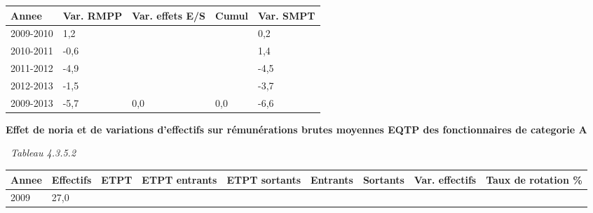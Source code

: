 \begin{longtable}[]{@{}lllll@{}}
\toprule
Annee & Var. RMPP & Var. effets E/S & Cumul & Var. SMPT\tabularnewline
\midrule
\endhead
2009-2010 & 1,2 & & & 0,2\tabularnewline
2010-2011 & -0,6 & & & 1,4\tabularnewline
2011-2012 & -4,9 & & & -4,5\tabularnewline
2012-2013 & -1,5 & & & -3,7\tabularnewline
2009-2013 & -5,7 & 0,0 & 0,0 & -6,6\tabularnewline
\bottomrule
\end{longtable}

\textbf{Effet de noria et de variations d'effectifs sur rémunérations
brutes moyennes EQTP des fonctionnaires de categorie A}

~\emph{Tableau 4.3.5.2}

\begin{longtable}[]{@{}lllllllll@{}}
\toprule
\begin{minipage}[b]{0.05\columnwidth}\raggedright
Annee\strut
\end{minipage} & \begin{minipage}[b]{0.08\columnwidth}\raggedright
Effectifs\strut
\end{minipage} & \begin{minipage}[b]{0.04\columnwidth}\raggedright
ETPT\strut
\end{minipage} & \begin{minipage}[b]{0.10\columnwidth}\raggedright
ETPT entrants\strut
\end{minipage} & \begin{minipage}[b]{0.10\columnwidth}\raggedright
ETPT sortants\strut
\end{minipage} & \begin{minipage}[b]{0.07\columnwidth}\raggedright
Entrants\strut
\end{minipage} & \begin{minipage}[b]{0.07\columnwidth}\raggedright
Sortants\strut
\end{minipage} & \begin{minipage}[b]{0.11\columnwidth}\raggedright
Var. effectifs\strut
\end{minipage} & \begin{minipage}[b]{0.14\columnwidth}\raggedright
Taux de rotation \%\strut
\end{minipage}\tabularnewline
\midrule
\endhead
\begin{minipage}[t]{0.05\columnwidth}\raggedright
2009\strut
\end{minipage} & \begin{minipage}[t]{0.08\columnwidth}\raggedright
27,0\strut
\end{minipage} & \begin{minipage}[t]{0.04\columnwidth}\raggedright

\end{minipage}
\end{longtable}
